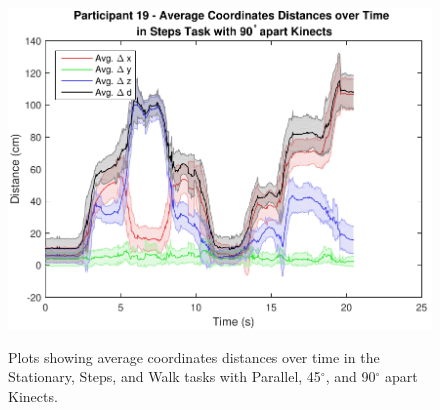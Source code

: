 \begin{figure}[!h]
{    \includegraphics[width=0.33\linewidth]{figs/Participant_19_Task_Steps_Kinect_90_coordinates_over_time}
  } \\

  \caption{Plots showing average coordinates distances over time in the Stationary, Steps, and Walk tasks with Parallel, 45$^{\circ}$, and 90$^{\circ}$ apart Kinects.}

  \label{fig:results_three_coordinates_over_time}
\end{figure}

